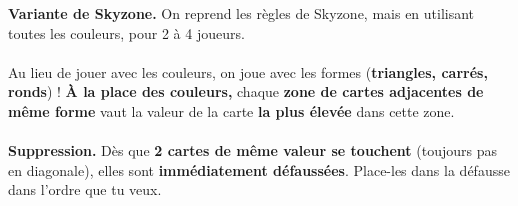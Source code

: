 \documentclass[a4paper]{memoir}
\begin{document}
{\footnotesize

\noindent
\textbf{ Variante de Skyzone.} 
On reprend les règles de Skyzone, mais en utilisant toutes les couleurs, pour 2 à 4 joueurs.
\\
\\
\noindent
{} Au lieu de jouer avec les couleurs, on joue avec les formes (\textbf{triangles, carrés, ronds}) !  
\textbf{À la place des couleurs,} chaque \textbf{zone de cartes adjacentes de même forme} vaut la valeur de la carte \textbf{la plus élevée} dans cette zone.
\\
\\
\noindent
\textbf{ Suppression.} 
Dès que \textbf{2 cartes de même valeur se touchent} (toujours pas en diagonale), elles sont \textbf{immédiatement défaussées}. 
Place-les dans la défausse dans l'ordre que tu veux.
}
\end{document}
